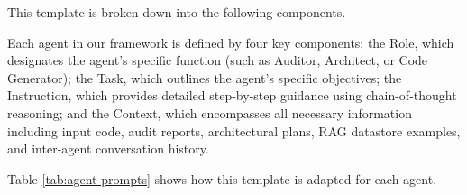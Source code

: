This template is broken down into the following components.

Each agent in our framework is defined by four key components: the Role, which designates the agent’s specific function (such as Auditor, Architect, or Code Generator); the Task, which outlines the agent’s specific objectives; the Instruction, which provides detailed step-by-step guidance using chain-of-thought reasoning; and the Context, which encompasses all necessary information including input code, audit reports, architectural plans, RAG datastore examples, and inter-agent conversation history.

Table \ref{tab:agent-prompts} shows how this template is adapted for each agent.

